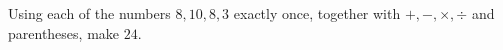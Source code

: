 Using each of the numbers $8,10,8,3$ exactly once, together with $+,-,\times,\div$ and parentheses, make $24$.
